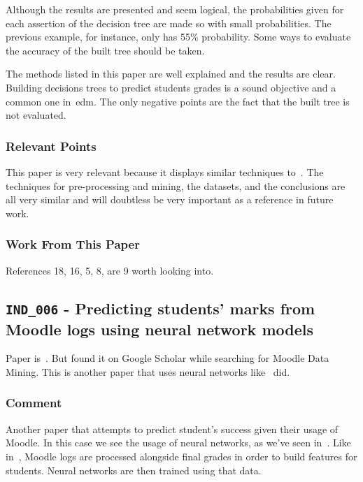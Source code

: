 Although the results are presented and seem logical, the probabilities given
for each assertion of the decision tree are made so with small probabilities.
The previous example, for instance, only has 55\% probability. Some ways to
evaluate the accuracy of the built tree should be taken.

The methods listed in this paper are well explained and the results are clear.
Building decisions trees to predict students grades is a sound objective and a
common one in~\gls{edm}. The only negative points are the fact that the built
tree is not evaluated.

\subsubsection{Relevant Points}

This paper is very relevant because it displays similar techniques
to~\cite{ind_002, ind_004}. The techniques for pre-processing and mining, the
datasets, and the conclusions are all very similar and will doubtless be very
important as a reference in future work.

\subsubsection{Work From This Paper}

References 18, 16, 5, 8, are 9 worth looking into.

\subsection{\texttt{IND\_006} - Predicting students' marks from Moodle logs using
neural network models}

Paper is~\cite{ind_006}. But found it on Google Scholar while searching for
Moodle Data Mining. This is another paper that uses neural networks
like~\cite{ind_003} did.

\subsubsection{Comment}

Another paper that attempts to predict student's success given their usage of
Moodle. In this case we see the usage of neural networks, as we've seen
in~\cite{ind_003}. Like in~\cite{ind_001, ind_002, ind_004, ind_005}, Moodle
logs are processed alongside final grades in order to build features for
students.  Neural networks are then trained using that data.

